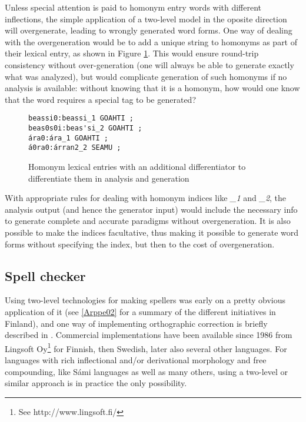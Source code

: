 \documentclass[a4paper,english]{article}
\begin{document}
Unless special attention is paid to homonym entry words with different inflections, the simple application of a two-level model in the oposite direction will overgenerate, leading to wrongly generated word forms. One way of dealing with the overgeneration would be to add a unique string to homonyms as part of their lexical entry, as shown in Figure \ref{homonlex}. This would ensure round-trip consistency without over-generation (one will always be able to generate exactly what was analyzed), but would complicate generation of such homonyms if no analysis is available: without knowing that it is a homonym, how would one know that the word requires a special tag to be generated?

\begin{figure}[htb]
\begin{center}
\begin{verbatim}
beassi0:beassi_1 GOAHTI ;
beas0s0i:beas'si_2 GOAHTI ;
ára0:ára_1 GOAHTI ;
á0ra0:árran2_2 SEAMU ;
\end{verbatim}
\end{center}
\caption{Homonym lexical entries with an additional differentiator to differentiate them in analysis and generation}
\label{homonlex}
\end{figure}

With appropriate rules for dealing with homonym indices like \textit{\_1} and \textit{\_2}, the analysis output (and hence the generator input) would include the necessary info to generate complete and accurate paradigms without overgeneration. It is also possible to make the indices facultative, thus making it possible to generate word forms without specifying the index, but then to the cost of overgeneration.

\subsection{Spell checker}\label{spell}

Using two-level technologies for making spellers was early on a pretty obvious application of it (see \ref{Arppe02} for a summary of the different initiatives in Finland), and one way of implementing orthographic correction is briefly described in \cite{Beesley03}. Commercial implementations have been available since 1986 from Lingsoft Oy\footnote{See http://www.lingsoft.fi/} for Finnish, then Swedish, later also several other languages. For languages with rich inflectional and/or derivational morphology and free compounding, like Sámi languages as well as many others, using a two-level or similar approach is in practice the only possibility.
\end{document}
